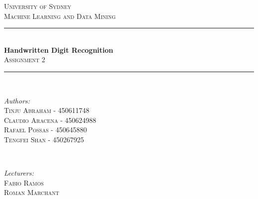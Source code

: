 \documentclass[letterpaper,10pt]{article}
\theoremstyle{mytheor}
\begin{document}
\begin{titlepage}

\newcommand{\HRule}{\rule{\linewidth}{0.5mm}} %

\center %
 

\textsc{\LARGE University of Sydney}\\[1.5cm] %

\textsc{\Large Machine Learning and Data Mining}\\[0.5cm] %


\HRule \\[0.4cm]
{ \huge \bfseries Handwritten Digit Recognition}\\[0.4cm] %
\textsc{\Large Assignment 2}\\[0.5cm]
\HRule \\[1.5cm]
 

\begin{minipage}{0.4\textwidth}
\begin{flushleft} \large
\emph{Authors:}\\
\textsc{Tinju Abraham - 450611748\\		
		Claudio Aracena - 450624988\\
		Rafael Possas - 450645880\\
		Tengfei Shan - 450267925\\
} %
\end{flushleft}
\end{minipage}
~
\begin{minipage}{0.4\textwidth}
\begin{flushright} \large
\emph{Lecturers:} \\
 \textsc{Fabio Ramos\\
 		 Roman Marchant} %
\end{flushright}
\end{minipage}\\[4cm]


\end{titlepage}
\end{document}
